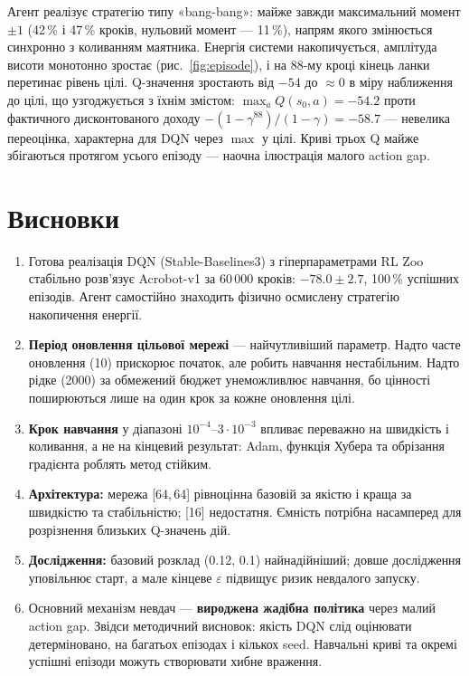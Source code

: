 \documentclass[11pt,a4paper]{article}
\begin{document}
Агент реалізує стратегію типу «bang-bang»: майже завжди максимальний момент $\pm1$ (42\,\% і 47\,\% кроків, нульовий момент — 11\,\%), напрям якого змінюється синхронно з коливанням маятника. Енергія системи накопичується, амплітуда висоти монотонно зростає (рис.~\ref{fig:episode}), і на 88-му кроці кінець ланки перетинає рівень цілі. Q-значення зростають від $-54$ до $\approx0$ в міру наближення до цілі, що узгоджується з їхнім змістом: $\max_aQ(s_0,a)=-54.2$ проти фактичного дисконтованого доходу $-(1-\gamma^{88})/(1-\gamma)=-58.7$ — невелика переоцінка, характерна для DQN через $\max$ у цілі. Криві трьох Q майже збігаються протягом усього епізоду — наочна ілюстрація малого action gap.

\section{Висновки}
\begin{enumerate}
\item Готова реалізація DQN (Stable-Baselines3) з гіперпараметрами RL Zoo стабільно розв'язує Acrobot-v1 за 60\,000 кроків: $-78.0\pm2.7$, 100\,\% успішних епізодів. Агент самостійно знаходить фізично осмислену стратегію накопичення енергії.
\item \textbf{Період оновлення цільової мережі} — найчутливіший параметр. Надто часте оновлення (10) прискорює початок, але робить навчання нестабільним. Надто рідке (2000) за обмежений бюджет унеможливлює навчання, бо цінності поширюються лише на один крок за кожне оновлення цілі.
\item \textbf{Крок навчання} у діапазоні $10^{-4}$–$3\cdot10^{-3}$ впливає переважно на швидкість і коливання, а не на кінцевий результат: Adam, функція Хубера та обрізання градієнта роблять метод стійким.
\item \textbf{Архітектура:} мережа [64,\,64] рівноцінна базовій за якістю і краща за швидкістю та стабільністю; [16] недостатня. Ємність потрібна насамперед для розрізнення близьких Q-значень дій.
\item \textbf{Дослідження:} базовий розклад (0.12, 0.1) найнадійніший; довше дослідження уповільнює старт, а мале кінцеве $\varepsilon$ підвищує ризик невдалого запуску.
\item Основний механізм невдач — \textbf{вироджена жадібна політика} через малий action gap. Звідси методичний висновок: якість DQN слід оцінювати детерміновано, на багатьох епізодах і кількох seed. Навчальні криві та окремі успішні епізоди можуть створювати хибне враження.
\end{enumerate}
\end{document}
